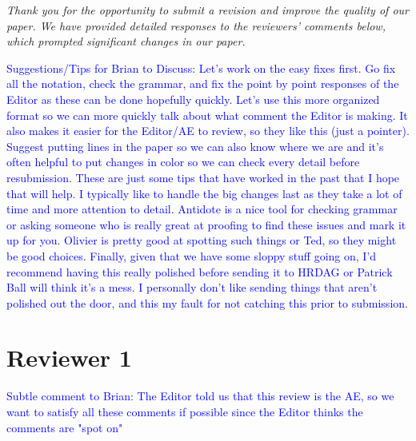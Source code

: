 \documentclass[letterpaper, parskip]{scrartcl}
\newcounter{responsectr}[section]     %
\newcommand{\reply}[1]{%
	\refstepcounter{responsectr}%
		\begin{tcolorbox}
			\itshape #1
		\end{tcolorbox}
}
\begin{document}
\reply{%
	Thank you for the opportunity to submit a revision and improve the quality of our paper. We have provided detailed responses to the reviewers' comments below, which prompted significant changes in our paper.
}

\textcolor{blue}{Suggestions/Tips for Brian to Discuss: Let's work on the easy fixes first. Go fix all the notation, check the grammar, and fix the point by point responses of the Editor as these can be done hopefully quickly. Let's use this more organized format so we can more quickly talk about what comment the Editor is making. It also makes it easier for the Editor/AE to review, so they like this (just a pointer). Suggest putting lines in the paper so we can also know where we are and it's often helpful to put changes in color so we can check every detail before resubmission. These are just some tips that have worked in the past that I hope that will help. I typically like to handle the big changes last as they take a lot of time and more attention to detail. Antidote is a nice tool for checking grammar or asking someone who is really great at proofing to find these issues and mark it up for you. Olivier is pretty good at spotting such things or Ted, so they might be good choices. Finally, given that we have some sloppy stuff going on, I'd recommend having this really polished before sending it to HRDAG or Patrick Ball will think it's a mess. I personally don't like sending things that aren't polished out the door, and this my fault for not catching this prior to submission.}

	\clearpage
	\newpage

	\section*{Reviewer 1}

\textcolor{blue}{Subtle comment to Brian: The Editor told us that this review is the AE, so we want to satisfy all these comments if possible since the Editor thinks the comments are "spot on"}


	\setcounter{responsectr}{0}
\end{document}
